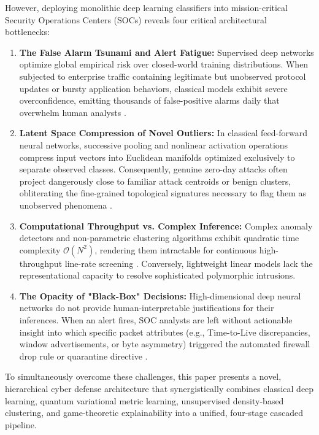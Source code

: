 \documentclass[preprint,12pt]{elsarticle}
\begin{document}
However, deploying monolithic deep learning classifiers into mission-critical Security Operations Centers (SOCs) reveals four critical architectural bottlenecks:
\begin{enumerate}
    \item \textbf{The False Alarm Tsunami and Alert Fatigue:} Supervised deep networks optimize global empirical risk over closed-world training distributions. When subjected to enterprise traffic containing legitimate but unobserved protocol updates or bursty application behaviors, classical models exhibit severe overconfidence, emitting thousands of false-positive alarms daily that overwhelm human analysts \cite{axelsson2000base}.
    \item \textbf{Latent Space Compression of Novel Outliers:} In classical feed-forward neural networks, successive pooling and nonlinear activation operations compress input vectors into Euclidean manifolds optimized exclusively to separate observed classes. Consequently, genuine zero-day attacks often project dangerously close to familiar attack centroids or benign clusters, obliterating the fine-grained topological signatures necessary to flag them as unobserved phenomena \cite{chandola2009anomaly}.
    \item \textbf{Computational Throughput vs. Complex Inference:} Complex anomaly detectors and non-parametric clustering algorithms exhibit quadratic time complexity $\mathcal{O}(N^2)$, rendering them intractable for continuous high-throughput line-rate screening \cite{ester1996density}. Conversely, lightweight linear models lack the representational capacity to resolve sophisticated polymorphic intrusions.
    \item \textbf{The Opacity of "Black-Box" Decisions:} High-dimensional deep neural networks do not provide human-interpretable justifications for their inferences. When an alert fires, SOC analysts are left without actionable insight into which specific packet attributes (e.g., Time-to-Live discrepancies, window advertisements, or byte asymmetry) triggered the automated firewall drop rule or quarantine directive \cite{guidotti2018survey}.
\end{enumerate}

To simultaneously overcome these challenges, this paper presents a novel, hierarchical cyber defense architecture that synergistically combines classical deep learning, quantum variational metric learning, unsupervised density-based clustering, and game-theoretic explainability into a unified, four-stage cascaded pipeline. 
\end{document}
